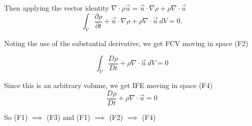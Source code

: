 Then applying the vector identity $\nabla\cdot\rho \vec{u} = \vec{u}\cdot\nabla \rho + \rho\nabla\cdot \vec{u}$
\[
  \int_{V} { \frac{\partial\rho}{\partial t} + \vec{u}\cdot\nabla \rho + \rho\nabla\cdot \vec{u}} \: d{V} = 0
.\] 

Noting the use of the substantial derivative, we get FCV moving in space (F2)

\begin{equation}
  \boxed{\int_{V}{\frac{D \rho}{Dt} + \rho\nabla\cdot \vec{u}} \: d{V} = 0}
\end{equation}

Since this is an arbitrary volume, we get IFE moving in space (F4)
\begin{equation}
  \boxed{\frac{D \rho}{Dt} + \rho\nabla\cdot \vec{u} = 0}
\end{equation}

So (F1) $\implies$ (F3) and (F1) $\implies$ (F2) $\implies$ (F4)
